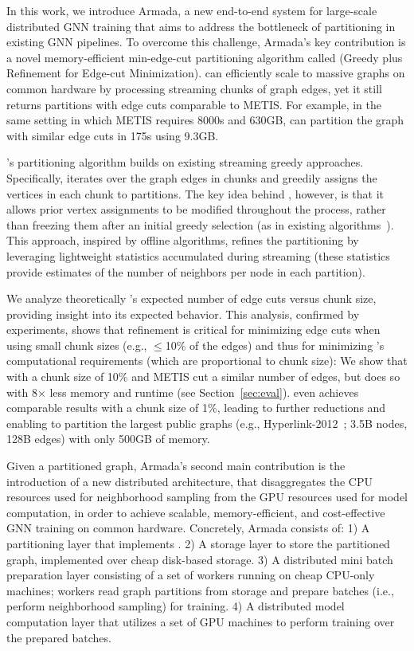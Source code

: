 In this work, we introduce Armada, a new end-to-end system for large-scale distributed GNN training that aims to address the bottleneck of partitioning in existing GNN pipelines. To overcome this challenge, Armada's key contribution is a novel memory-efficient min-edge-cut partitioning algorithm called \partitioning (Greedy plus Refinement for Edge-cut Minimization). \partitioning can efficiently scale to massive graphs on common hardware by processing streaming chunks of graph edges, yet it still returns partitions with edge cuts comparable to METIS. For example, in the same setting in which METIS requires 8000s and 630GB, \partitioning can partition the graph with similar edge cuts in 175s using 9.3GB.

\partitioning's partitioning algorithm builds on existing streaming greedy approaches. 
Specifically, \partitioning iterates over the graph edges in chunks and greedily assigns the vertices in each chunk to partitions. The key idea behind \partitioning, however, is that it allows prior vertex assignments to be modified throughout the process, rather than freezing them after an initial greedy selection (as in existing algorithms~\cite{abbas2018streaming}). This approach, inspired by offline algorithms, refines the partitioning by leveraging lightweight statistics accumulated during streaming (these statistics provide estimates of the number of neighbors per node in each partition).

We analyze theoretically \partitioning's expected number of edge cuts versus chunk size, providing insight into its expected behavior. This analysis, confirmed by experiments, shows that refinement is critical for minimizing edge cuts when using small chunk sizes (e.g., $\le$10\% of the edges) and thus for minimizing \partitioning's computational requirements (which are proportional to chunk size): We show that \partitioning with a chunk size of 10\% and METIS cut a similar number of edges, but \partitioning does so with 8$\times$ less memory and runtime (see Section~\ref{sec:eval}). \partitioning even achieves comparable results with a chunk size of 1\%, leading to further reductions and enabling \partitioning to partition the largest public graphs (e.g., Hyperlink-2012~\cite{hyperlink}; 3.5B nodes, 128B edges) with only 500GB of memory.

Given a partitioned graph, Armada's second main contribution is the introduction of a new distributed architecture, that disaggregates the CPU resources used for neighborhood sampling from the GPU resources used for model computation, in order to achieve scalable, memory-efficient, and cost-effective GNN training on common hardware. Concretely, Armada consists of: 1) A partitioning layer that implements \partitioning. 2) A storage layer to store the partitioned graph, implemented over cheap disk-based storage. 3) A distributed mini batch preparation layer consisting of a set of workers running on cheap CPU-only machines; workers read graph partitions from storage and prepare batches (i.e., perform neighborhood sampling) for training. 4) A distributed model computation layer that utilizes a set of GPU machines to perform training over the prepared batches.

